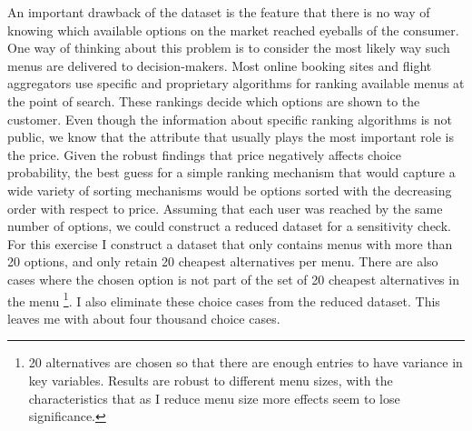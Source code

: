 \documentclass[a4paper,12pt]{article}
\begin{document}
An important drawback of the dataset is the feature that there is no way of knowing which available options on the market reached eyeballs of the consumer. One way of thinking about this problem is to consider the most likely way such menus are delivered to decision-makers. Most online booking sites and flight aggregators use specific and proprietary algorithms for ranking available menus at the point of search. These rankings decide which options are shown to the customer. Even though the information about specific ranking algorithms is not public, we know that the attribute that usually plays the most important role is the price. Given the robust findings that price negatively affects choice probability, the best guess for a simple ranking mechanism that would capture a wide variety of sorting mechanisms would be options sorted with the decreasing order with respect to price. Assuming that each user was reached by the same number of options, we could construct a reduced dataset for a sensitivity check. For this exercise I construct a dataset that only contains menus with more than 20 options, and only retain 20 cheapest alternatives per menu. There are also cases where the chosen option is not part of the set of 20 cheapest alternatives in the menu \footnote{20 alternatives are chosen so that there are enough entries to have variance in key variables. Results are robust to different menu sizes, with the characteristics that as I reduce menu size more effects seem to lose significance.}. I also eliminate these choice cases from the reduced dataset. This leaves me with about four thousand choice cases.

\clearpage
\end{document}
